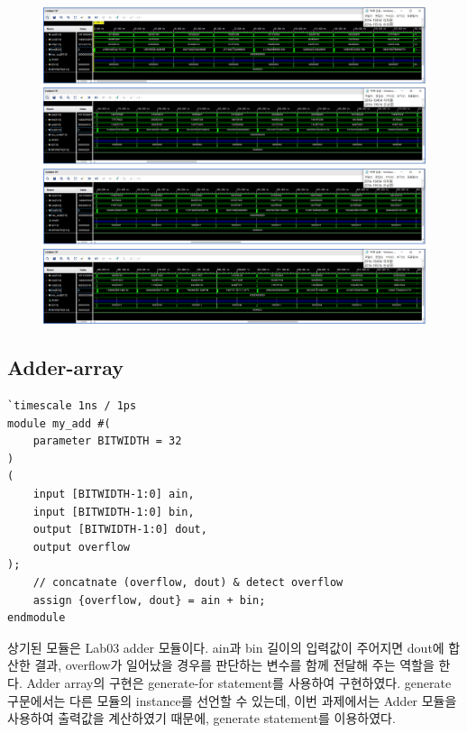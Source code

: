 \documentclass{article}
\begin{document}
\newpage
\begin{figure}[ht]
	\centering
	\includegraphics[width=1.0\textwidth]{../report/Waveform_32bit_Int_Multiply-Adder/tb_int_muladd1.png}
	\includegraphics[width=1.0\textwidth]{../report/Waveform_32bit_Int_Multiply-Adder/tb_int_muladd2.png}
	\includegraphics[width=1.0\textwidth]{../report/Waveform_32bit_Int_Multiply-Adder/tb_int_muladd3.png}
	\includegraphics[width=1.0\textwidth]{../report/Waveform_32bit_Int_Multiply-Adder/tb_int_muladd4.png}
\end{figure}

\subsection{Adder-array}

\begin{lstlisting}[style={verilog-style}]
`timescale 1ns / 1ps
module my_add #(
    parameter BITWIDTH = 32
)
(
    input [BITWIDTH-1:0] ain,
    input [BITWIDTH-1:0] bin,
    output [BITWIDTH-1:0] dout,
    output overflow
);
    // concatnate (overflow, dout) & detect overflow
    assign {overflow, dout} = ain + bin;
endmodule
\end{lstlisting}

상기된 모듈은 Lab03 adder 모듈이다. ain과 bin 길이의 입력값이 주어지면 dout에 합산한 결과, overflow가 일어났을 경우를 판단하는 변수를 함께 전달해 주는 역할을 한다. Adder array의 구현은 generate-for statement를 사용하여 구현하였다. generate 구문에서는 다른 모듈의 instance를 선언할 수 있는데, 이번 과제에서는 Adder 모듈을 사용하여 출력값을 계산하였기 때문에, generate statement를 이용하였다.
\end{document}
